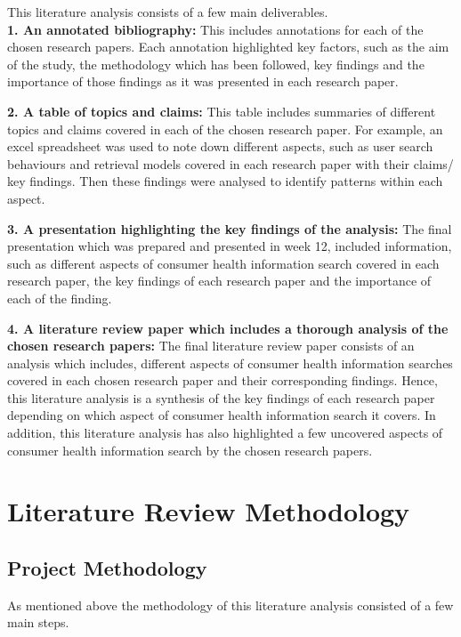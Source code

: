 \documentclass[]{article}
\begin{document}
This literature analysis consists of a few main deliverables.\\
	
\textbf{1. An annotated bibliography:} This includes annotations for each of the chosen research papers. Each annotation highlighted key factors, such as the aim of the study, the methodology which has been followed, key findings and the importance of those findings as it was presented in each research paper.  
	
\textbf{2. A table of topics and claims:} This table includes summaries of different topics and claims covered in each of the chosen research paper. For example, an excel spreadsheet was used to note down different aspects, such as user search behaviours and retrieval models covered in each research paper with their claims/ key findings. Then these findings were analysed to identify patterns within each aspect.  
	
\textbf{3. A presentation highlighting the key findings of the analysis:} The final presentation which was prepared and presented in week 12, included information, such as different aspects of consumer health information search covered in each research paper, the key findings of each research paper and the importance of each of the finding.  
	
\textbf{4. A literature review paper which includes a thorough analysis of the chosen research papers:} The final literature review paper consists of an analysis which includes, different aspects of consumer health information searches covered in each chosen research paper and their corresponding findings. Hence, this literature analysis is a synthesis of the key findings of each research paper depending on which aspect of consumer health information search it covers. In addition, this literature analysis has also highlighted a few uncovered aspects of consumer health information search by the chosen research papers.
	
\section{Literature Review Methodology}

\subsection{Project Methodology}    
	
As mentioned above the methodology of this literature analysis consisted of a few main steps.\\
	
\end{document}
